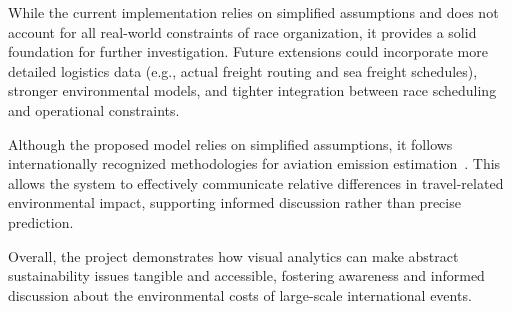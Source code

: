 \documentclass{egpubl}
\begin{document}
While the current implementation relies on simplified assumptions and does not account for all real-world constraints of race organization, it provides a solid foundation for further investigation. Future extensions could incorporate more detailed logistics data (e.g., actual freight routing and sea freight schedules), stronger environmental models, and tighter integration between race scheduling and operational constraints.

Although the proposed model relies on simplified assumptions, it follows internationally recognized methodologies for aviation emission estimation~\cite{ICAOCalculatorMethodology}. This allows the system to effectively communicate relative differences in travel-related environmental impact, supporting informed discussion rather than precise prediction.

Overall, the project demonstrates how visual analytics can make abstract sustainability issues tangible and accessible, fostering awareness and informed discussion about the environmental costs of large-scale international events.



\end{document}
